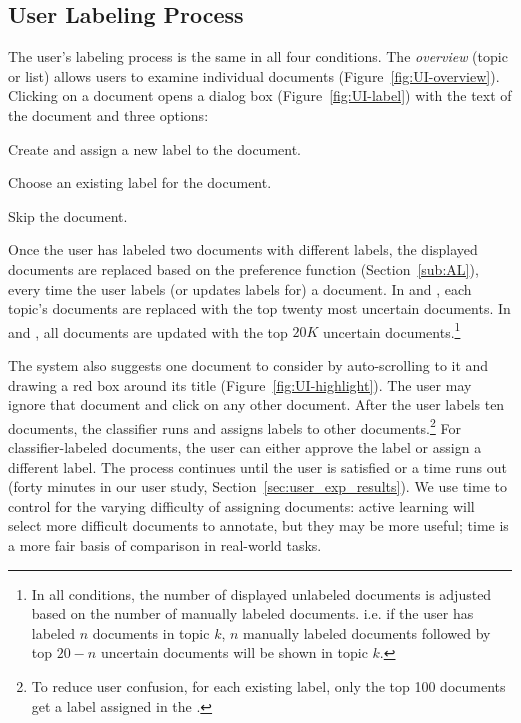 \subsection{User Labeling Process}\label{sub:interaction}





The user's labeling process is the same in all four conditions. The
\emph{overview} (topic or list) allows users to examine individual
documents (Figure~\ref{fig:UI-overview}). Clicking on a document opens a dialog box
(Figure~\ref{fig:UI-label}) with the text of the document and three
options:
\begin{enumerate*}
  \item Create and assign a new label to the document.
  \item Choose an existing label for the document.
  \item Skip the document.
\end{enumerate*}








Once the user has labeled two documents with different labels, the displayed
documents are replaced based on the preference function (Section~\ref{sub:AL}),
every time the user labels (or updates labels for) a document. In  and
, each topic's documents are replaced with the top twenty most uncertain
documents. In  and , all documents are updated with the top
$20K$ uncertain documents.\footnote{In all conditions, the number of displayed unlabeled documents is adjusted based on the number of manually labeled documents. i.e. if the user has labeled $n$ documents in topic $k$, $n$ manually labeled documents followed by top $20-n$ uncertain documents will be shown in topic $k$.}

The system also suggests one document to
consider by auto-scrolling to it and drawing a red box around its title
(Figure~\ref{fig:UI-highlight}). The user may ignore that document and click on any other
document. After the user labels ten documents, the classifier runs and assigns
labels to other documents.\footnote{To reduce user confusion, for each existing
  label, only the top 100 documents get a label assigned in the .} For
classifier-labeled documents, the user can either approve the label or assign a
different label. The process continues until the user is satisfied or a time
runs out (forty minutes in our user study, Section~\ref{sec:user_exp_results}).
We use time to control for the varying difficulty of assigning documents: active
learning will select more difficult documents to annotate, but they may be more
useful; time is a more fair basis of comparison in real-world tasks.